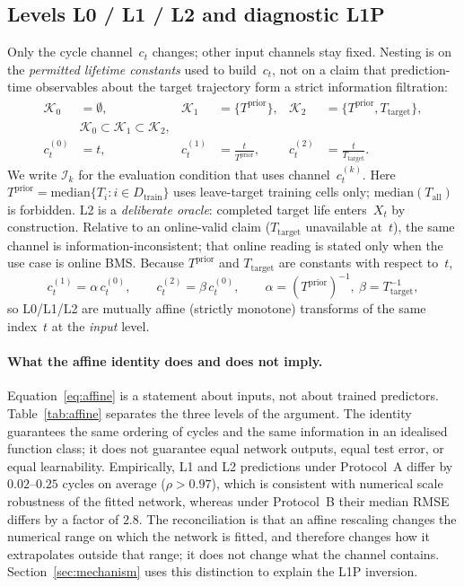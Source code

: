 \documentclass[preprint,12pt]{elsarticle}
\begin{document}
\subsection{Levels L0 / L1 / L2 and diagnostic L1P}
\label{sec:levels}

Only the cycle channel~$c_t$ changes; other input channels stay fixed.
Nesting is on the \emph{permitted lifetime constants} used to build~$c_t$, not on a claim that prediction-time observables about the target trajectory form a strict information filtration:
\begin{equation}
\label{eq:nested}
\begin{aligned}
\mathcal{K}_0&=\emptyset,&
\mathcal{K}_1&=\{T^{\mathrm{prior}}\},&
\mathcal{K}_2&=\{T^{\mathrm{prior}},T_{\mathrm{target}}\},\\
&\mathcal{K}_0\subset\mathcal{K}_1\subset\mathcal{K}_2,\\
c_t^{(0)}&=t,&
c_t^{(1)}&=\frac{t}{T^{\mathrm{prior}}},&
c_t^{(2)}&=\frac{t}{T_{\mathrm{target}}}.
\end{aligned}
\end{equation}
We write $\mathcal{I}_k$ for the evaluation condition that uses channel~$c_t^{(k)}$.
Here $T^{\mathrm{prior}}=\mathrm{median}\{T_i:i\in D_{\mathrm{train}}\}$ uses leave-target training cells only; $\mathrm{median}(T_{\mathrm{all}})$ is forbidden.
L2 is a \emph{deliberate oracle}: completed target life enters~$X_t$ by construction.
Relative to an online-valid claim ($T_{\mathrm{target}}$ unavailable at~$t$), the same channel is information-inconsistent; that online reading is stated only when the use case is online BMS.
Because $T^{\mathrm{prior}}$ and $T_{\mathrm{target}}$ are constants with respect to~$t$,
\begin{equation}
\label{eq:affine}
c_t^{(1)}=\alpha\,c_t^{(0)},\qquad
c_t^{(2)}=\beta\,c_t^{(0)},\qquad
\alpha=(T^{\mathrm{prior}})^{-1},\ \beta=T_{\mathrm{target}}^{-1},
\end{equation}
so L0/L1/L2 are mutually affine (strictly monotone) transforms of the same index~$t$ at the \emph{input} level.

\paragraph{What the affine identity does and does not imply.}
Equation~\eqref{eq:affine} is a statement about inputs, not about trained predictors.
Table~\ref{tab:affine} separates the three levels of the argument.
The identity guarantees the same ordering of cycles and the same information in an idealised function class; it does not guarantee equal network outputs, equal test error, or equal learnability.
Empirically, L1 and L2 predictions under Protocol~A differ by $0.02$--$0.25$ cycles on average ($\rho>0.97$), which is consistent with numerical scale robustness of the fitted network, whereas under Protocol~B their median RMSE differs by a factor of $2.8$.
The reconciliation is that an affine rescaling changes the numerical range on which the network is fitted, and therefore changes how it extrapolates outside that range; it does not change what the channel contains.
Section~\ref{sec:mechanism} uses this distinction to explain the L1P inversion.
\end{document}
